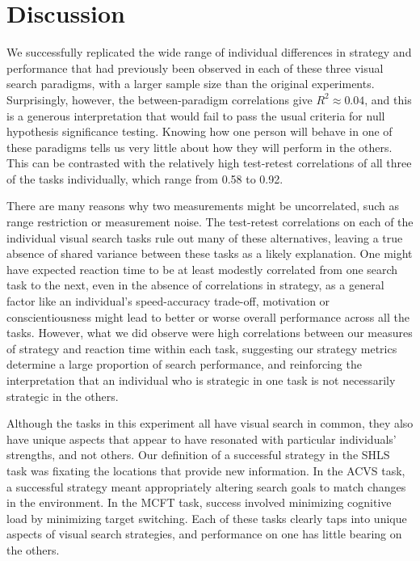 \documentclass[a4paper, man, natbib, floatsintext]{apa6}
\begin{document}
\section{Discussion}

We successfully replicated the wide range of individual differences in strategy and performance that had previously been observed in each of these three visual search paradigms, with a larger sample size than the original experiments. Surprisingly, however, the between-paradigm correlations give $R^2 \approx 0.04$, and this is a generous interpretation that would fail to pass the usual criteria for null hypothesis significance testing. Knowing how one person will behave in one of these paradigms tells us very little about how they will perform in the others. This can be contrasted with the relatively high test-retest correlations of all three of the tasks individually, which range from  0.58 to 0.92. 

There are many reasons why two measurements might be uncorrelated, such as range restriction or measurement noise. The test-retest correlations on each of the individual visual search tasks rule out many of these alternatives, leaving a true absence of shared variance between these tasks as a likely explanation. One might have expected reaction time to be at least modestly correlated from one search task to the next, even in the absence of correlations in strategy, as a general factor like an individual's speed-accuracy trade-off, motivation or conscientiousness might lead to better or worse overall performance across all the tasks. However, what we did observe were high correlations between our measures of strategy and reaction time within each task, suggesting our strategy metrics determine a large proportion of search performance, and reinforcing the interpretation that an individual who is strategic in one task is not necessarily strategic in the others. 

Although the tasks in this experiment all have visual search in common, they also have unique aspects that appear to have resonated with particular individuals' strengths, and not others. Our definition of a successful strategy in the SHLS task was fixating the locations that provide new information. In the ACVS task, a successful strategy meant appropriately altering search goals to match changes in the environment. In the MCFT task, success involved minimizing cognitive load by minimizing target switching. Each of these tasks clearly taps into unique aspects of visual search strategies, and performance on one has little bearing on the others. 
\end{document}
